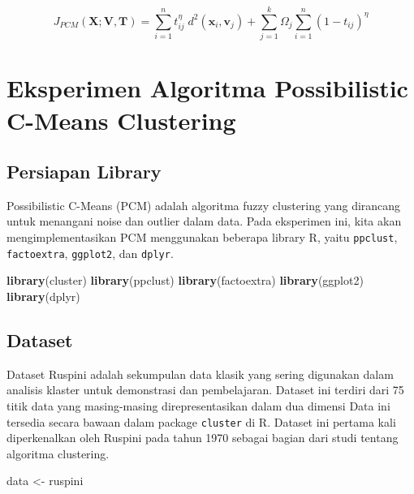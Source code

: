 \documentclass[
  oneside]{book}
\newenvironment{Shaded}{\begin{snugshade}}{\end{snugshade}}
\newcommand{\FunctionTok}[1]{\textcolor[rgb]{0.13,0.29,0.53}{\textbf{#1}}}
\newcommand{\NormalTok}[1]{#1}
\newcommand{\OtherTok}[1]{\textcolor[rgb]{0.56,0.35,0.01}{#1}}
\begin{document}
\[
J_{PCM}(\mathbf{X}; \mathbf{V}, \mathbf{T}) = \sum_{i=1}^n t_{ij}^\eta \; d^2(\mathbf{x}_i, \mathbf{v}_j) + \sum_{j=1}^k \Omega_j \sum_{i=1}^n (1 - t_{ij})^\eta
\]

\section{Eksperimen Algoritma Possibilistic C-Means Clustering}\label{eksperimen-algoritma-possibilistic-c-means-clustering}

\subsection*{Persiapan Library}\label{persiapan-library}

Possibilistic C-Means (PCM) adalah algoritma fuzzy clustering yang dirancang untuk menangani noise dan outlier dalam data. Pada eksperimen ini, kita akan mengimplementasikan PCM menggunakan beberapa library R, yaitu \texttt{ppclust}, \texttt{factoextra}, \texttt{ggplot2}, dan \texttt{dplyr}.

\begin{Shaded}
\begin{Highlighting}[]
\FunctionTok{library}\NormalTok{(cluster)}
\FunctionTok{library}\NormalTok{(ppclust)}
\FunctionTok{library}\NormalTok{(factoextra)}
\FunctionTok{library}\NormalTok{(ggplot2)}
\FunctionTok{library}\NormalTok{(dplyr)}
\end{Highlighting}
\end{Shaded}

\subsection*{Dataset}\label{dataset}

Dataset Ruspini adalah sekumpulan data klasik yang sering digunakan dalam analisis klaster untuk demonstrasi dan pembelajaran. Dataset ini terdiri dari 75 titik data yang masing-masing direpresentasikan dalam dua dimensi Data ini tersedia secara bawaan dalam package \texttt{cluster} di R. Dataset ini pertama kali diperkenalkan oleh Ruspini pada tahun 1970 sebagai bagian dari studi tentang algoritma clustering.

\begin{Shaded}
\begin{Highlighting}[]
\NormalTok{data }\OtherTok{\textless{}{-}}\NormalTok{ ruspini}
\end{Highlighting}
\end{Shaded}
\end{document}

